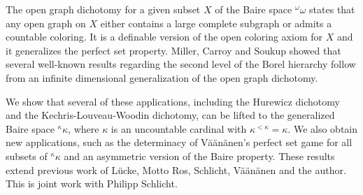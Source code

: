 \documentclass[bsl,meeting]{asl}
\newcommand{\NP}{}
\begin{document}
\thispagestyle{empty}


\NP  
{}


The open graph dichotomy 
for a given subset $X$ of the Baire space ${}^\omega\omega$ 
states that any open graph on $X$ either contains a large complete subgraph or admits a countable coloring. 
It is a definable version of the open coloring axiom for $X$ and it generalizes the perfect set property. 
Miller, Carroy and Soukup showed that several well-known results regarding
the second level of the Borel hierarchy
follow from  an infinite dimensional generalization of the open graph dichotomy.

We show that several of these applications, 
including the Hurewicz dichotomy and the Kechris-Louveau-Woodin dichotomy,
can be lifted to the generalized Baire space ${}^\kappa\kappa$,
where $\kappa$ is an uncountable cardinal with $\kappa^{<\kappa}=\kappa$.
We also obtain new applications, such as
the determinacy of V\"a\"an\"anen's perfect set game for all subsets of ${}^\kappa\kappa$ and an asymmetric version of the Baire property. 
These results extend previous work of 
L\"ucke, Motto Ros, Schlicht, V\"a\"an\"anen and the author. 
This is joint work with Philipp Schlicht.






\vspace*{-0.5\baselineskip}
\end{document}
